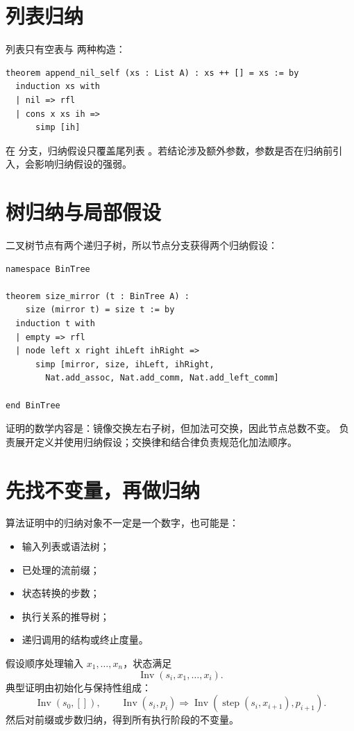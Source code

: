 \section{列表归纳}

列表只有空表与  两种构造：
\begin{lstlisting}
theorem append_nil_self (xs : List A) : xs ++ [] = xs := by
  induction xs with
  | nil => rfl
  | cons x xs ih =>
      simp [ih]
\end{lstlisting}
在  分支，归纳假设只覆盖尾列表 。若结论涉及额外参数，参数是否在归纳前引入，会影响归纳假设的强弱。

\section{树归纳与局部假设}

二叉树节点有两个递归子树，所以节点分支获得两个归纳假设：
\begin{lstlisting}
namespace BinTree

theorem size_mirror (t : BinTree A) :
    size (mirror t) = size t := by
  induction t with
  | empty => rfl
  | node left x right ihLeft ihRight =>
      simp [mirror, size, ihLeft, ihRight,
        Nat.add_assoc, Nat.add_comm, Nat.add_left_comm]

end BinTree
\end{lstlisting}
证明的数学内容是：镜像交换左右子树，但加法可交换，因此节点总数不变。 负责展开定义并使用归纳假设；交换律和结合律负责规范化加法顺序。

\section{先找不变量，再做归纳}

算法证明中的归纳对象不一定是一个数字，也可能是：
\begin{itemize}
  \item 输入列表或语法树；
  \item 已处理的流前缀；
  \item 状态转换的步数；
  \item 执行关系的推导树；
  \item 递归调用的结构或终止度量。
\end{itemize}

假设顺序处理输入 $x_1,\ldots,x_n$，状态满足
\[
\operatorname{Inv}(s_i,x_1,\ldots,x_i).
\]
典型证明由初始化与保持性组成：
\[
\operatorname{Inv}(s_0,[]) ,\qquad
\operatorname{Inv}(s_i,p_i)\Rightarrow
\operatorname{Inv}(\operatorname{step}(s_i,x_{i+1}),p_{i+1}).
\]
然后对前缀或步数归纳，得到所有执行阶段的不变量。

